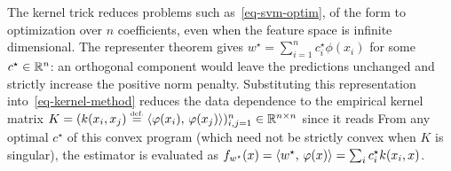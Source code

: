\begin{rem}
	The kernel trick reduces problems such as~\eqref{eq-svm-optim}, of the form
	to optimization over $n$ coefficients, even when the feature space is infinite dimensional. The representer theorem gives
	$w^\star = \sum_{i=1}^n c_i^\star \phi(x_i)$ for some $c^\star \in \mathbb{R}^n$: an orthogonal component would leave the predictions unchanged and strictly increase the positive norm penalty.
	Substituting this representation into~\eqref{eq-kernel-method} reduces the data dependence to the empirical kernel matrix $K = ( k(x_i,x_j)\stackrel{\mbox{\upshape\tiny def.}}{=} \langle \varphi(x_i),\,\varphi(x_j)\rangle )_{i,j=1}^n \in \mathbb{R}^{n \times n}$ since it reads
	From any optimal $c^\star$ of this convex program (which need not be strictly convex when $K$ is singular), the estimator is evaluated as
	$f_{w^\star}(x)=\langle w^\star,\,\varphi(x)\rangle = \sum_i c_i^\star k(x_i,x)$. 
\end{rem} 